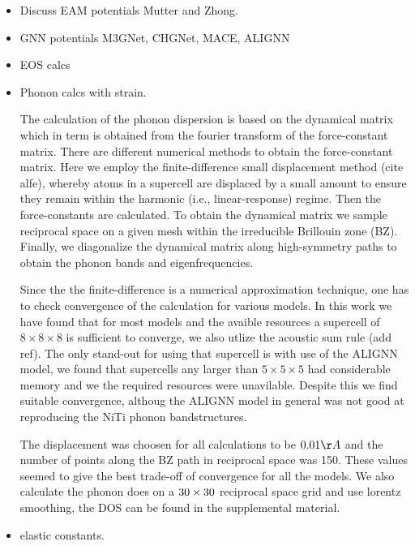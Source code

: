 \documentclass[preprint]{elsarticle}
\begin{document}
\begin{itemize}
\item Discuss EAM potentials Mutter and Zhong.
\item GNN potentials M3GNet, CHGNet, MACE, ALIGNN
\item EOS calcs
\item Phonon calcs with strain.
  
  The calculation of the phonon dispersion is based on the dynamical matrix which in term is obtained from the fourier transform of the force-constant matrix. There are different numerical methods to obtain the force-constant matrix. Here we employ the finite-difference small displacement method (cite alfe), whereby atoms in a supercell are displaced by a small amount to ensure they remain within the harmonic (i.e., linear-response) regime. Then the force-constants are calculated. To obtain the dynamical matrix we sample reciprocal space on a given mesh within the irreducible Brillouin zone (BZ). Finally, we diagonalize the dynamical matrix along high-symmetry paths to obtain the phonon bands and eigenfrequencies. \par

  Since the the finite-difference is a numerical approximation technique, one has to check convergence of the calculation for various models. In this work we have found that for most models and the avaible resources a supercell of $8\times8\times8$ is sufficient to converge, we also utlize the acoustic sum rule (add ref). The only stand-out for using that supercell is with use of the ALIGNN model, we found that supercells any larger than $5\times5\times5$ had considerable memory and we the required resources were unavilable. Despite this we find suitable convergence, althoug the ALIGNN model in general was not good at reproducing the NiTi phonon bandstructures. \par

  The displacement was choosen for all calculations to be $0.01\AA$ and the number of points along the BZ path in reciprocal space was 150. These values seemed to give the best trade-off of convergence for all the models. We also calculate the phonon does on a $30\times30\time30$ reciprocal space grid and use lorentz smoothing, the DOS can be found in the supplemental material.\par

  
\item elastic constants.
\end{itemize}
\end{document}
